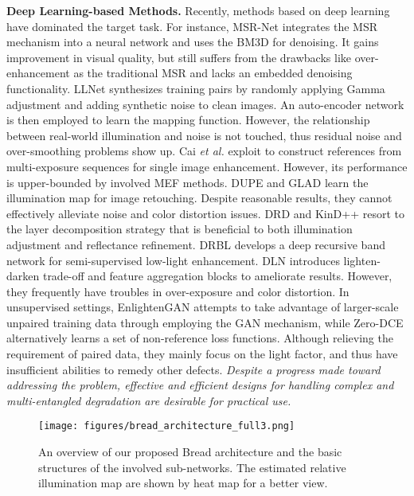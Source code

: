\documentclass[10pt,twocolumn,letterpaper]{article}
\begin{document}
\textbf{Deep Learning-based Methods.}
Recently, methods based on deep learning have dominated the target task. For instance, MSR-Net \cite{shen2017msr} integrates the MSR mechanism into a neural network and uses the BM3D \cite{Dabov2007ImageDB} for denoising. It gains improvement in visual quality, but still suffers from the drawbacks like over-enhancement as the traditional MSR and lacks an embedded denoising functionality. LLNet \cite{lore2017llnet} synthesizes training pairs by randomly applying Gamma adjustment and adding synthetic noise to clean images. An auto-encoder network is then employed to learn the mapping function. However, the relationship between real-world illumination and noise is not touched, thus residual noise and over-smoothing problems show up. Cai \emph{et al.} \cite{cai2018learning} exploit to construct references from multi-exposure sequences for single image enhancement. However, its performance is upper-bounded by involved MEF methods. DUPE \cite{wang2019underexposed} and GLAD \cite{wang2018gladnet} learn the illumination map for image retouching. Despite reasonable results, they cannot effectively alleviate noise and color distortion issues. DRD \cite{DBLP:conf/bmvc/WeiWY018} and KinD++ \cite{zhang2021beyond} resort to the layer decomposition strategy that is beneficial to both illumination adjustment and reflectance refinement. DRBL \cite{yang2020fidelity} develops a deep recursive band network for semi-supervised low-light enhancement. DLN \cite{wang2020lightening} introduces lighten-darken trade-off and feature aggregation blocks to ameliorate results. However, they frequently have troubles in over-exposure and color distortion. In unsupervised settings, EnlightenGAN \cite{jiang2021enlightengan} attempts to take advantage of larger-scale unpaired training data through employing the GAN mechanism, while Zero-DCE \cite{guo2020zero} alternatively learns a set of non-reference loss functions. Although relieving the requirement of paired data, they mainly focus on the light factor, and thus have insufficient abilities to remedy other defects. \emph{Despite a progress made toward addressing the problem, effective and efficient designs for handling complex and multi-entangled degradation are desirable for practical use.}



\begin{figure*}[t]
\texttt{[image: figures/bread\_architecture\_full3.png]}
\caption{An overview of our proposed Bread architecture and the basic structures of the involved sub-networks. The estimated relative illumination map are shown by heat map for a better view. } 
\label{fig:full_architecture}
\end{figure*}
\end{document}

